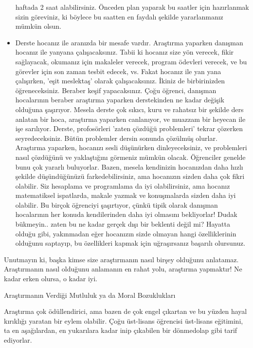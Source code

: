 \documentclass[12pt,fleqn]{article}\usepackage{../../common}
\begin{document}
\begin{itemize}
  haftada 2 saat alabilirsiniz. Önceden plan yaparak bu saatler için
  hazırlanmak sizin göreviniz, ki böylece bu saatten en faydalı şekilde
  yararlanmanız mümkün olsun.
\item Derste hocanız ile aranızda bir mesafe vardır. Araştırma yaparken
  danışman hocanız ile yanyana çalışacaksınız. Tabii ki hocanız size yön
  verecek, fikir sağlayacak, okumanız için makaleler verecek, program
  ödevleri verecek, ve bu görevler için son zaman tesbit edecek, vs. Fakat
  hocanız ile yan yana çalışırken, 'eşit meslektaş' olarak
  çalışacaksınız. İkiniz de birbirinizden öğreneceksiniz. Beraber keşif
  yapacaksınız. Çoğu öğrenci, danışman hocalarının beraber araştırma
  yaparken derstekinden ne kadar değişik olduğuna şaşırıyor. Mesela derste
  çok sıkıcı, kuru ve rahatsız bir şekilde ders anlatan bir hoca, araştırma
  yaparken canlanıyor, ve muazzam bir heyecan ile işe sarılıyor. Derste,
  profosörleri 'zaten çözdüğü problemleri' tekrar çözerken
  seyredeceksiniz. Bütün problemler dersin sonunda çözülmüş
  olurlar. Araştırma yaparken, hocanızı sesli düşünürken dinleyeceksiniz,
  ve problemleri nasıl çözdüğünü ve yaklaştığını görmeniz mümkün
  olacak. Öğrenciler genelde bunu çok yararlı buluyorlar. Bazen, mesela
  kendinizin hocanızdan daha hızlı şekilde düşündüğünüzü farkedebilirsiniz,
  ama hocanızın sizden daha çok fikri olabilir. Siz hesaplama ve
  programlama da iyi olabilirsiniz, ama hocanız matematiksel ispatlarda,
  makale yazmak ve konuşmalarda sizden daha iyi olabilir. Bu birçok
  öğrenciyi şaşırtıyor, çünkü tipik olarak danışman hocalarının her konuda
  kendilerinden daha iyi olmasını bekliyorlar! Dudak bükmeyin.. zaten bu ne
  kadar gerçek dışı bir beklenti değil mi? Hayatta olduğu gibi, yakınmadan
  eğer hocanızın sizde olmayan hangi özelliklerinin olduğunu saptayıp, bu
  özellikleri kapmak için uğraşırsanız başarılı olursunuz.
\end{itemize}

Unutmayın ki, başka kimse size araştırmanın nasıl birşey olduğunu
anlatamaz. Araştırmanın nasıl olduğunu anlamanın en rahat yolu, araştırma
yapmaktır! Ne kadar erken olursa, o kadar iyi.

Araştırmanın Verdiği Mutluluk ya da Moral Bozuklukları

Araştırma çok ödüllendirici, ama bazen de çok engel çıkartan ve bu yüzden
hayal kırıklığı yaratan bir eylem olabilir. Çoğu üst-lisans öğrencisi
üst-lisans eğitimini, ta en aşağılardan, en yukarılara kadar inip çıkabilen
bir dönmedolap gibi tarif ediyorlar.
\end{document}

